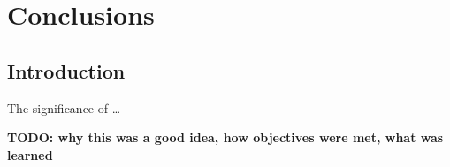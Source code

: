 %
%
%
%

\chapter{Conclusions}\label{C.conclusions}

\section{Introduction}\label{S.Concl.intro}

The significance of \ldots

\textbf{TODO: why this was a good idea, how objectives were met, what was
    learned}
